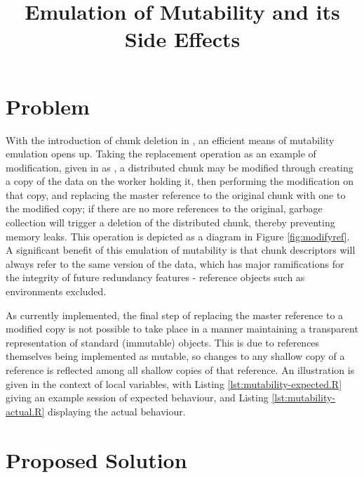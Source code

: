 \documentclass[10pt, a4paper]{article}
\begin{document}
\title{Emulation of Mutability and its Side Effects}
  
\maketitle

\section{Problem}

With the introduction of chunk deletion in \lsr{}, an efficient means of mutability emulation opens up.
Taking the replacement operation as an example of modification, given in \R{} as \hsrc{\$<-}, a distributed chunk may be modified through creating a copy of the data on the worker holding it, then performing the modification on that copy, and replacing the master reference to the original chunk with one to the modified copy; if there are no more references to the original, garbage collection will trigger a deletion of the distributed chunk, thereby preventing memory leaks.
This operation is depicted as a diagram in Figure \ref{fig:modifyref}.
A significant benefit of this emulation of mutability is that chunk descriptors will always refer to the same version of the data, which has major ramifications for the integrity of future redundancy features - reference objects such as environments excluded.

As currently implemented, the final step of replacing the master reference to a modified copy is not possible to take place in a manner maintaining a transparent representation of standard (immutable) \R{} objects.
This is due to references themselves being implemented as mutable, so changes to any shallow copy of a reference is reflected among all shallow copies of that reference.
An illustration is given in the context of local variables, with Listing \ref{lst:mutability-expected.R} giving an example \R{} session of expected behaviour, and Listing \ref{lst:mutability-actual.R} displaying the actual behaviour.

\section{Proposed Solution}
\end{document}
